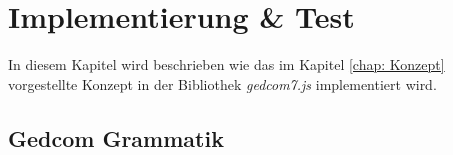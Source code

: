 \chapter{Implementierung \& Test}
\label{chap: Implementierung und Test}
In diesem Kapitel wird beschrieben wie das im Kapitel \ref{chap: Konzept} vorgestellte Konzept in der Bibliothek \textit{gedcom7.js} implementiert wird. 

\section{Gedcom Grammatik}
\label{sec: Implementierung - Gedcom Grammatik}
